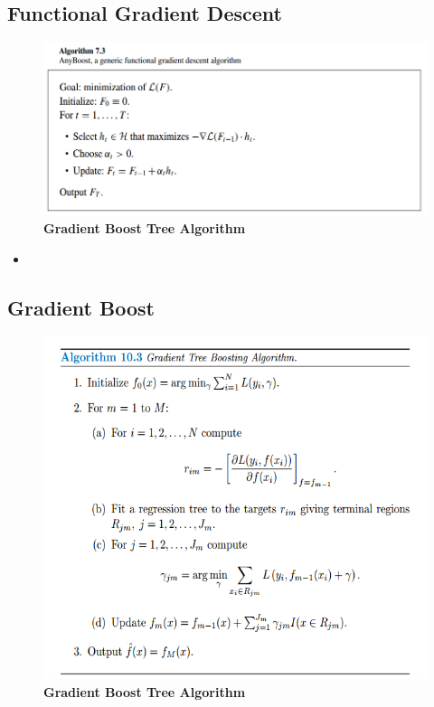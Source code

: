 \documentclass[11pt]{article}
\begin{document}
\subsection{Functional Gradient Descent}
\begin{figure}
\begin{minipage}[h!]{1\linewidth}
  \centering
  \centerline{\includegraphics[scale = 0.4]{anyboost.png}}
\end{minipage}
\caption{\footnotesize{\textbf{Gradient Boost Tree Algorithm \citep{hastie2009elements}}}}
\label{fig: grad_boost}
\end{figure}
\begin{itemize}
\item 
\end{itemize}

\subsection{Gradient Boost}
\begin{figure}
\begin{minipage}[t]{1\linewidth}
  \centering
  \centerline{\includegraphics[scale = 0.5]{grad_boost.png}}
\end{minipage}
\caption{\footnotesize{\textbf{Gradient Boost Tree Algorithm \citep{hastie2009elements}}}}
\label{fig: grad_boost}
\end{figure}
\end{document}
